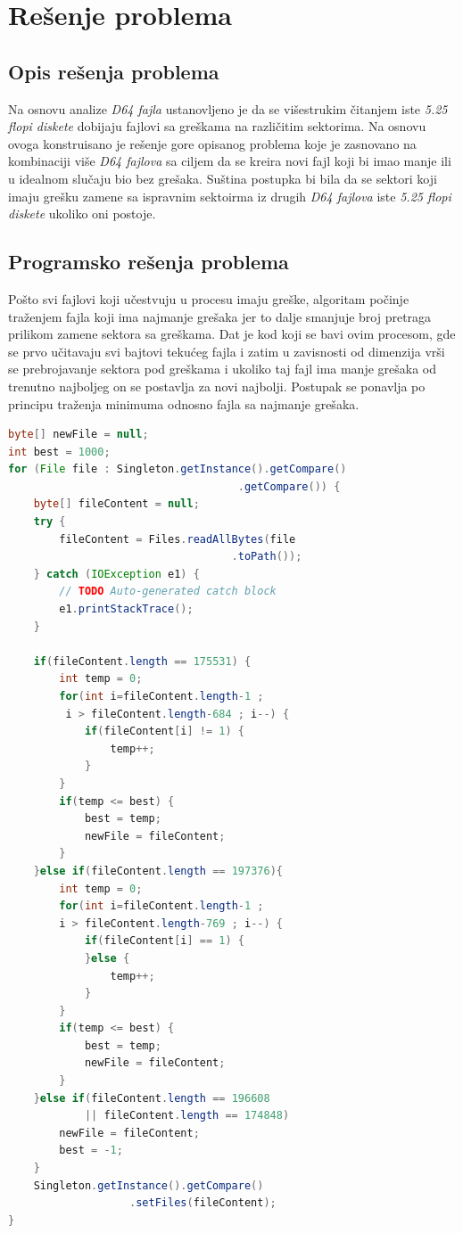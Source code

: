 \section{Rešenje problema}
\subsection{Opis rešenja problema}

Na osnovu analize \textit{D64 fajla} ustanovljeno je da se višestrukim čitanjem iste \textit{5.25 flopi diskete} dobijaju fajlovi sa greškama na različitim sektorima. Na osnovu ovoga konstruisano je rešenje gore opisanog problema koje je zasnovano na kombinaciji više \textit{D64 fajlova} sa ciljem da se kreira novi fajl koji bi imao manje ili u idealnom slučaju bio  bez grešaka. Suština postupka bi bila da se sektori koji imaju grešku zamene sa ispravnim sektoirma iz drugih \textit{D64 fajlova} iste \textit{5.25 flopi diskete} ukoliko oni postoje.

\subsection{Programsko rešenja problema}

Pošto svi fajlovi koji učestvuju u procesu imaju greške, algoritam počinje traženjem fajla koji ima najmanje grešaka jer to dalje smanjuje broj pretraga prilikom zamene sektora sa greškama. Dat je kod koji se bavi ovim procesom, gde se prvo učitavaju svi bajtovi tekućeg fajla i zatim u zavisnosti od dimenzija vrši se prebrojavanje sektora pod greškama i ukoliko taj fajl ima manje grešaka od trenutno najboljeg on se postavlja za novi najbolji. Postupak se ponavlja  po principu traženja minimuma odnosno fajla sa najmanje grešaka.

\begin{lstlisting}[language=Java]
byte[] newFile = null;
int best = 1000;
for (File file : Singleton.getInstance().getCompare()
                                    .getCompare()) {
    byte[] fileContent = null;
    try {
    	fileContent = Files.readAllBytes(file
    	                           .toPath());
    } catch (IOException e1) {
    	// TODO Auto-generated catch block
    	e1.printStackTrace();
    }
    
    if(fileContent.length == 175531) {
    	int temp = 0;
    	for(int i=fileContent.length-1 ; 
    	 i > fileContent.length-684 ; i--) {
            if(fileContent[i] != 1) {
            	temp++;
            }
        }
    	if(temp <= best) {
    		best = temp;
    		newFile = fileContent;
    	}
    }else if(fileContent.length == 197376){
    	int temp = 0;
    	for(int i=fileContent.length-1 ; 
    	i > fileContent.length-769 ; i--) {
            if(fileContent[i] == 1) {
            }else {
            	temp++;
            }
        }
    	if(temp <= best) {
    		best = temp;
    		newFile = fileContent;
    	}
    }else if(fileContent.length == 196608 
            || fileContent.length == 174848)
    	newFile = fileContent;
    	best = -1;
    }	
    Singleton.getInstance().getCompare()
                   .setFiles(fileContent);
}
\end{lstlisting}


